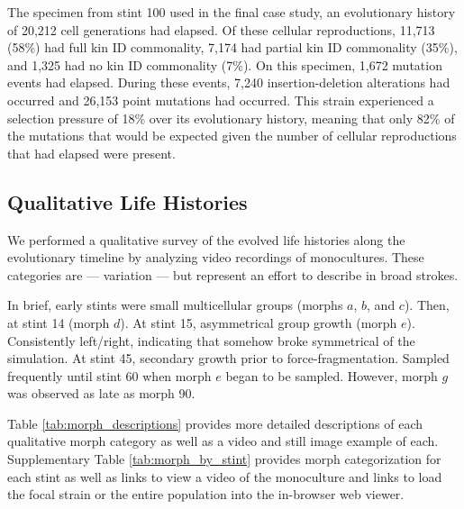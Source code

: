 The specimen from stint 100 used in the final case study, an evolutionary history of 20,212 cell generations had elapsed.
Of these cellular reproductions, 11,713 (58\%) had full kin ID commonality, 7,174 had partial kin ID commonality (35\%), and 1,325 had no kin ID commonality (7\%).
On this specimen, 1,672 mutation events had elapsed.
During these events, 7,240 insertion-deletion alterations had occurred and 26,153 point mutations had occurred.
This strain experienced a selection pressure of 18\% over its evolutionary history, meaning that only 82\% of the mutations that would be expected given the number of cellular reproductions that had elapsed were present. 

\subsection{Qualitative Life Histories}



We performed a qualitative survey of the evolved life histories along the evolutionary timeline by analyzing video recordings of monocultures.
These categories are --- variation --- but represent an effort to describe in broad strokes.

In brief, early stints were small multicellular groups  (morphs $a$, $b$, and $c$).
Then, at stint 14 (morph $d$).
At stint 15, asymmetrical group growth (morph $e$).
Consistently left/right, indicating that somehow broke symmetrical of the simulation.
At stint 45, secondary growth prior to force-fragmentation.
Sampled frequently until stint 60 when morph $e$ began to be sampled.
However, morph $g$ was observed as late as morph 90.

Table \ref{tab:morph_descriptions} provides more detailed descriptions of each qualitative morph category as well as a video and still image example of each.
Supplementary Table \ref{tab:morph_by_stint} provides morph categorization for each stint as well as links to view a video of the monoculture and links to load the focal strain or the entire population into the in-browser web viewer.


